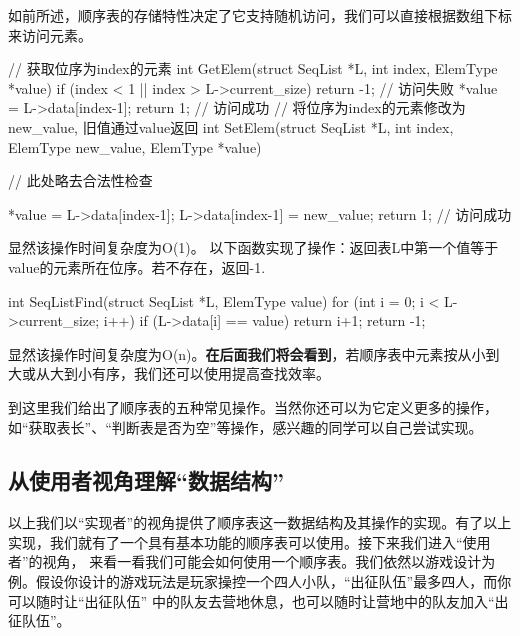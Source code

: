如前所述，顺序表的存储特性决定了它支持随机访问，我们可以直接根据数组下标来访问元素。
\begin{cppcode}
    // 获取位序为index的元素
    int GetElem(struct SeqList *L, int index, ElemType *value) {
        if (index < 1 || index > L->current_size) {
            return -1; // 访问失败
        }
        *value = L->data[index-1];
        return 1;     // 访问成功
    }
    // 将位序为index的元素修改为new_value, 旧值通过value返回
    int SetElem(struct SeqList *L, int index, ElemType new_value, ElemType *value) {
        // 此处略去合法性检查

        *value = L->data[index-1];
        L->data[index-1] = new_value;
        return 1;     // 访问成功
    }
\end{cppcode}
显然该操作时间复杂度为O(1)。
以下函数实现了操作：返回表L中第一个值等于value的元素所在位序。若不存在，返回-1.
\begin{cppcode}
    int SeqListFind(struct SeqList *L, ElemType value) {
        for (int i = 0; i < L->current_size; i++) {
            if (L->data[i] == value) {
                return i+1;
            }
        }
        return -1;
    }
\end{cppcode}
显然该操作时间复杂度为O(n)。{\color{red}\textbf{在后面我们将会看到}}，若顺序表中元素按从小到大或从大到小有序，我们还可以使用提高查找效率。

到这里我们给出了顺序表的五种常见操作。当然你还可以为它定义更多的操作，如“获取表长”、“判断表是否为空”等操作，感兴趣的同学可以自己尝试实现。
\subsection{从使用者视角理解“数据结构”}
以上我们以“实现者”的视角提供了顺序表这一数据结构及其操作的实现。有了以上实现，我们就有了一个具有基本功能的顺序表可以使用。接下来我们进入“使用者”的视角，
来看一看我们可能会如何使用一个顺序表。我们依然以游戏设计为例。假设你设计的游戏玩法是玩家操控一个四人小队，“出征队伍”最多四人，而你可以随时让“出征队伍”
中的队友去营地休息，也可以随时让营地中的队友加入“出征队伍”。

